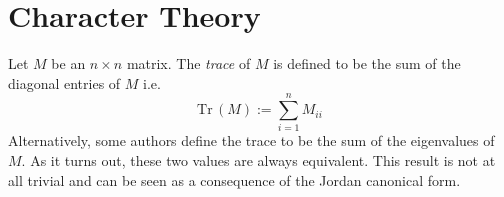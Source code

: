
            



\section{Character Theory}







\def\Tr{\text{Tr}\,}

\begin{definition}
    Let $M$ be an $n \times n$ matrix. The \emph{trace} of $M$ is defined to be the sum of the diagonal entries of 
    $M$ i.e.
    \[
        \Tr(M) := \sum_{i=1}^n M_{ii}
    \]
    Alternatively, some authors define the trace to be the sum of the eigenvalues of $M$. As it turns out, these 
    two values are always equivalent. This result is not at all trivial and can be seen as a consequence of the 
    Jordan canonical form.
\end{definition}

